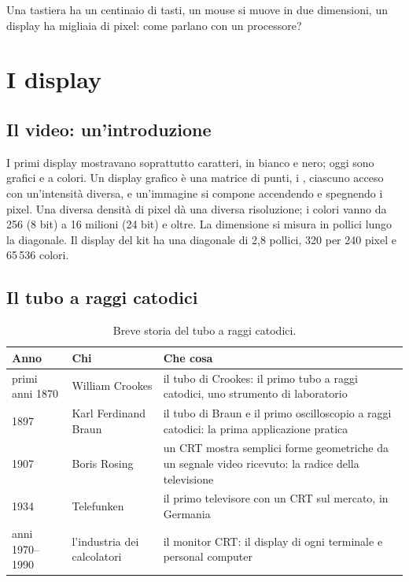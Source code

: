 Una tastiera ha un centinaio di tasti, un mouse si muove in due dimensioni, un
display ha migliaia di pixel: come parlano con un processore?

\section{I display}

\subsection{Il video: un'introduzione}

I primi display mostravano soprattutto caratteri, in bianco e nero; oggi sono
grafici e a colori. Un display grafico è una matrice di punti, i ,
ciascuno acceso con un'intensità diversa, e un'immagine si compone accendendo
e spegnendo i pixel. Una diversa densità di pixel dà una diversa risoluzione; i
colori vanno da 256 (8 bit) a 16 milioni (24 bit) e oltre. La dimensione si
misura in pollici lungo la diagonale. Il display del kit \prg ha una diagonale
di 2,8 pollici, 320 per 240 pixel e 65\,536 colori.

\subsection{Il tubo a raggi catodici}

\begin{table}[htb]
\centering\small
\caption{Breve storia del tubo a raggi catodici.}\label{tab:io:crt}
\begin{tabularx}{\textwidth}{@{}llL@{}}
\toprule
\textbf{Anno} & \textbf{Chi} & \textbf{Che cosa}\\
\midrule
primi anni 1870 & William Crookes & il tubo di Crookes: il primo tubo a raggi catodici, uno strumento di laboratorio\\
1897 & Karl Ferdinand Braun & il tubo di Braun e il primo oscilloscopio a raggi catodici: la prima applicazione pratica\\
1907 & Boris Rosing & un CRT mostra semplici forme geometriche da un segnale video ricevuto: la radice della televisione\\
1934 & Telefunken & il primo televisore con un CRT sul mercato, in Germania\\
anni 1970--1990 & l'industria dei calcolatori & il monitor CRT: il display di ogni terminale e personal computer\\
\bottomrule
\end{tabularx}
\end{table}

